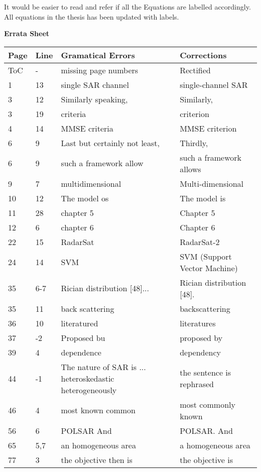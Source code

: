 \replyToComment
    {It would be easier to read and refer if all the Equations are labelled accordingly.}
    {All equations in the thesis has been updated with labels.}


\textbf{Errata Sheet}
    
\noindent
\begin{longtable}[c]{p{}|p{}|p{}|p{}}
\textbf{Page} & \textbf{Line} & \textbf{Gramatical Errors} & \textbf{Corrections} \\
 \hline
 \endhead
ToC & - & missing page numbers & Rectified \\
1 & 13 & single SAR channel & single-channel SAR \\ 
3 & 12 & Similarly speaking, & Similarly, \\
3 & 19 & criteria & criterion \\ 
4 & 14 & MMSE criteria & MMSE criterion \\
6 & 9 & Last but certainly not least, & Thirdly, \\ 
6 & 9 & such a framework allow & such a framework allows \\
9 & 7 & multidimensional & Multi-dimensional \\
10 & 12 & The model os & The model is \\
11 & 28 & chapter 5 & Chapter 5 \\
12 & 6 & chapter 6 & Chapter 6 \\
22 & 15 & RadarSat & RadarSat-2 \\
24 & 14 & SVM & SVM (Support Vector Machine) \\
35 & 6-7 & Rician distribution [48]... & Rician distribution [48]. \\
35 & 11 & back scattering & backscattering \\
36 & 10 & literatured & literatures \\
37 & -2 & Proposed bu & proposed by \\
39 & 4 & dependence & dependency \\
44 & -1 & The nature of SAR is ... heteroskedastic heterogeneously & the sentence is rephrased \\
46 & 4 & most known common & most commonly known \\
56 & 6 & POLSAR And & POLSAR. And \\
65 &5,7 & an homogeneous area & a homogeneous area \\
77 & 3 & the objective then is & the objective is \\

\end{longtable}
